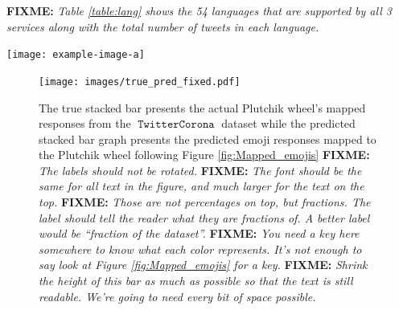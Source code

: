 \documentclass[11pt]{article}
\newcommand{\fixme}[1]{{\color{red} \textbf{FIXME:} {\textit {#1}}}}
\DeclareMathOperator{\corona}{\texttt{TwitterCorona}}
\begin{document}
\fixme{Table \ref{table:lang} shows the 54 languages that are supported by all 3 services along with the total number of tweets in each language.}

\begin{table}
    \centering
    \texttt{[image: example-image-a]}
    \caption{
        Language stats.
        \fixme{Ideally we would add this table, but if you don't have time we can take it out (or maybe I'll have time to create it).}
    }
    \label{table:lang}
\end{table}

\begin{figure}
    \centering
    \texttt{[image: images/true\_pred\_fixed.pdf]}
    \caption{
        The true stacked bar presents the actual Plutchik wheel's mapped responses from the $\corona$ dataset while the predicted stacked bar graph presents the predicted emoji responses mapped to the Plutchik wheel following Figure  \ref{fig:Mapped_emojis} 
        \fixme{The labels should not be rotated.}
        \fixme{The font should be the same for all text in the figure, and much larger for the text on the top.}
        \fixme{
            Those are not percentages on top, but fractions.
            The label should tell the reader what they are fractions of.
            A better label would be ``fraction of the dataset''.
        }
        \fixme{
            You need a key here somewhere to know what each color represents.
            It's not enough to say look at Figure \ref{fig:Mapped_emojis} for a key.
        }
        \fixme{
            Shrink the height of this bar as much as possible so that the text is still readable.
            We're going to need every bit of space possible.
        }
    }
    \label{fig:actual vs pred}
\end{figure}
\end{document}
